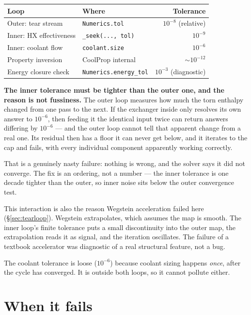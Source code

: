 \documentclass[11pt,a4paper]{report}
\newcommand{\code}[1]{\texttt{\small #1}}
\begin{document}
\begin{center}
\begin{tabular}{@{}llr@{}}
\toprule
Loop & Where & Tolerance \\
\midrule
Outer: tear stream & \code{Numerics.tol} & $10^{-8}$ (relative) \\
Inner: HX effectiveness & \code{\_seek(..., tol)} & $10^{-9}$ \\
Inner: coolant flow & \code{coolant.size} & $10^{-6}$ \\
Property inversion & CoolProp internal & $\sim 10^{-12}$ \\
Energy closure check & \code{Numerics.energy\_tol} & $10^{-3}$ (diagnostic) \\
\bottomrule
\end{tabular}
\end{center}

\textbf{The inner tolerance must be tighter than the outer one, and the
reason is not fussiness.} The outer loop measures how much the torn
enthalpy changed from one pass to the next. If the exchanger inside only
resolves its own answer to $10^{-6}$, then feeding it the identical input
twice can return answers differing by $10^{-6}$ --- and the outer loop
cannot tell that apparent change from a real one. Its residual then has a
floor it can never get below, and it iterates to the cap and fails, with
every individual component apparently working correctly.

That is a genuinely nasty failure: nothing is wrong, and the solver says
it did not converge. The fix is an ordering, not a number --- the inner
tolerance is one decade tighter than the outer, so inner noise sits below
the outer convergence test.

\begin{caveat}
This interaction is also the reason Wegstein acceleration failed here
(\S\ref{sec:tearloop}). Wegstein extrapolates, which assumes the map is
smooth. The inner loop's finite tolerance puts a small discontinuity into
the outer map, the extrapolation reads it as signal, and the iteration
oscillates. The failure of a textbook accelerator was diagnostic of a real
structural feature, not a bug.

The coolant tolerance is loose ($10^{-6}$) because coolant sizing happens
\emph{once}, after the cycle has converged. It is outside both loops, so
it cannot pollute either.
\end{caveat}

\section{When it fails}
\label{sec:whenitfails}
\end{document}
